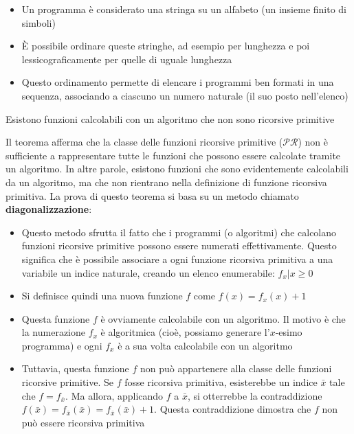 \documentclass[12pt, a4paper]{report}
\begin{document}
                \begin{itemize}
                    \item Un programma è considerato una stringa su un alfabeto (un insieme finito di simboli)
                    \item È possibile ordinare queste stringhe, ad esempio per lunghezza e poi lessicograficamente per quelle di uguale lunghezza
                    \item Questo ordinamento permette di elencare i programmi ben formati in una sequenza, associando a ciascuno un numero naturale (il suo posto nell'elenco)
                \end{itemize}
                \begin{theorembox}{}{}
                    Esistono funzioni calcolabili con un algoritmo che non sono ricorsive primitive
                \end{theorembox}
                 Il teorema afferma che la classe delle funzioni ricorsive primitive ($\mathcal{PR}$) non è sufficiente a rappresentare tutte le funzioni che possono essere calcolate tramite un algoritmo. In altre parole, esistono funzioni che sono evidentemente calcolabili da un algoritmo, ma che non rientrano nella definizione di funzione ricorsiva primitiva. La prova di questo teorema si basa su un metodo chiamato \textbf{diagonalizzazione}:
                 \begin{itemize}
                    \item Questo metodo sfrutta il fatto che i programmi (o algoritmi) che calcolano funzioni ricorsive primitive possono essere numerati effettivamente. Questo significa che è possibile associare a ogni funzione ricorsiva primitiva a una variabile un indice naturale, creando un elenco enumerabile: ${f_x | x \ge 0}$
                    \item Si definisce quindi una nuova funzione $f$ come $f(x) = f_x(x) + 1$
                    \item Questa funzione $f$ è ovviamente calcolabile con un algoritmo. Il motivo è che la numerazione $f_x$ è algoritmica (cioè, possiamo generare l'$x$-esimo programma) e ogni $f_x$ è a sua volta calcolabile con un algoritmo
                    \item Tuttavia, questa funzione $f$ non può appartenere alla classe delle funzioni ricorsive primitive. Se $f$ fosse ricorsiva primitiva, esisterebbe un indice $\bar{x}$ tale che $f = f_{\bar{x}}$. Ma allora, applicando $f$ a $\bar{x}$, si otterrebbe la contraddizione $f(\bar{x}) = f_{\bar{x}}(\bar{x}) = f_{\bar{x}}(\bar{x}) + 1$. Questa contraddizione dimostra che $f$ non può essere ricorsiva primitiva
                 \end{itemize}
\end{document}
